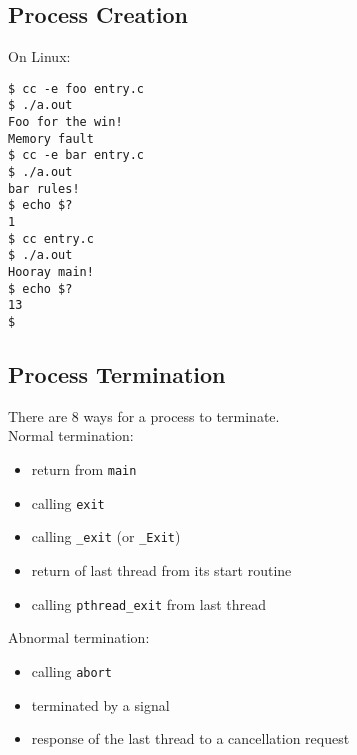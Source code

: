 \documentclass[xga]{xdvislides}
\begin{document}
\subsection{Process Creation}
On Linux:
\begin{verbatim}
$ cc -e foo entry.c
$ ./a.out
Foo for the win!
Memory fault
$ cc -e bar entry.c
$ ./a.out
bar rules!
$ echo $?
1
$ cc entry.c
$ ./a.out
Hooray main!
$ echo $?
13
$
\end{verbatim}

\subsection{Process Termination}
There are 8 ways for a process to terminate.
\\

Normal termination:
\begin{itemize}
	\item return from {\tt main}
	\item calling {\tt exit}
	\item calling {\tt \_exit} (or {\tt\_Exit})
	\item return of last thread from its start routine
	\item calling {\tt pthread\_exit} from last thread
\end{itemize}
\vspace{.25in}
Abnormal termination:
\begin{itemize}
	\item calling {\tt abort}
	\item terminated by a signal
	\item response of the last thread to a cancellation request
\end{itemize}
\end{document}

